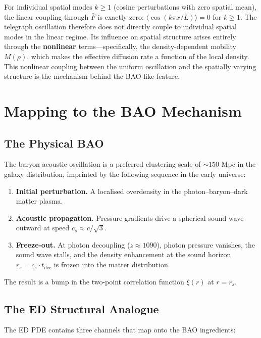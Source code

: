 \documentclass[11pt]{article}
\begin{document}
For individual spatial modes \(k \geq 1\) (cosine perturbations with zero spatial mean), the linear coupling through \(\bar{F}\) is exactly zero: \(\langle\cos(k\pi x/L)\rangle = 0\) for \(k \geq 1\). The telegraph oscillation therefore does not directly couple to individual spatial modes in the linear regime. Its influence on spatial structure arises entirely through the \textbf{nonlinear} terms---specifically, the density-dependent mobility \(M(\rho)\), which makes the effective diffusion rate a function of the local density. This nonlinear coupling between the uniform oscillation and the spatially varying structure is the mechanism behind the BAO-like feature.

\section{Mapping to the BAO Mechanism}

\subsection{The Physical BAO}

The baryon acoustic oscillation is a preferred clustering scale of \(\sim 150\) Mpc in the galaxy distribution, imprinted by the following sequence in the early universe:

\begin{enumerate}
  \item \textbf{Initial perturbation.} A localised overdensity in the photon--baryon--dark matter plasma.
  \item \textbf{Acoustic propagation.} Pressure gradients drive a spherical sound wave outward at speed \(c_s \approx c/\sqrt{3}\).
  \item \textbf{Freeze-out.} At photon decoupling (\(z \approx 1090\)), photon pressure vanishes, the sound wave stalls, and the density enhancement at the sound horizon \(r_s = c_s \cdot t_{\mathrm{dec}}\) is frozen into the matter distribution.
\end{enumerate}

The result is a bump in the two-point correlation function \(\xi(r)\) at \(r = r_s\).

\subsection{The ED Structural Analogue}

The ED PDE contains three channels that map onto the BAO ingredients:
\end{document}
